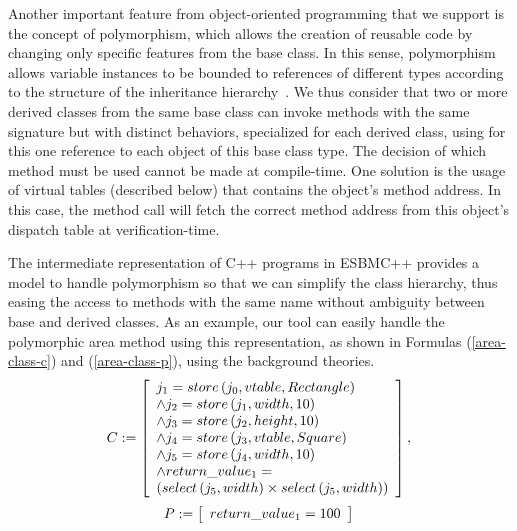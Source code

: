 \documentclass[conference]{IEEEtran}
\begin{document}
Another important feature from object-oriented programming that we
support is the concept of polymorphism, which allows the creation of
reusable code by changing only specific features from the base class.
In this sense, polymorphism allows variable instances to be
bounded to references of different types according to the structure of the
inheritance hierarchy~\cite{Alexander02}.
We thus consider that two or more derived classes
from the same base class can invoke methods with the same signature but
with distinct behaviors, specialized for each derived class, using for
this one reference to each object of this base class type. The decision
of which method must be used cannot be made at compile-time.
One solution is the usage of virtual tables (described below) that contains
the object's method address. In this case, the method call will fetch the correct method
address from this object's dispatch table at verification-time.



The intermediate representation of C++ programs in ESBMC++ provides a model
to handle polymorphism so that we can simplify the class hierarchy,
thus easing the access to methods with the same name without ambiguity between
base and derived classes. As an example, our tool can easily handle the polymorphic
area method using this representation, as shown in Formulas (\ref{area-class-c}) and
(\ref{area-class-p}), using the background theories.
%
\begin{equation}
\label{area-class-c}
C := \left [ \begin{array}{ll}
        j_{1} = store\left(j_{0}, vtable, Rectangle\right) \\
        \wedge j_{2} = store\left(j_{1}, width, 10\right) \\
        \wedge j_{3} = store\left(j_{2}, height, 10\right) \\
        \wedge j_{4} = store\left(j_{3}, vtable, Square\right) \\
        \wedge j_{5} = store\left(j_{4}, width, 10\right) \\
        \wedge return\_value_{1} = \\
        \left(select\left(j_{5}, width\right) \times select\left(j_{5}, width\right)\right) \\
              \end{array} \right ],  \\
\end{equation}
%
\begin{equation}
\label{area-class-p}
P := \left [ \begin{array}{ll}
              return\_value_{1} = 100 \\
              \end{array} \right ]  \\
\end{equation}
%
\end{document}
